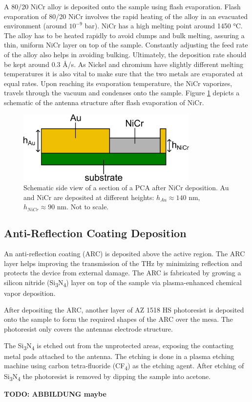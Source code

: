 A \num{80}/\num{20} NiCr alloy is deposited onto the sample using flash evaporation. Flash evaporation of \num{80}/\num{20} NiCr involves the rapid heating of the alloy in an evacuated environment (around $10^{-9}$ \si{\bar}). NiCr has a high melting point around \num{1450} \si{\celsius}. The alloy has to be heated rapidly to avoid clumps and bulk melting, assuring a thin, uniform NiCr layer on top of the sample. Constantly adjusting the feed rate of the alloy also helps in avoiding bulking. Ultimately, the deposition rate should be kept around \num{0.3} \si{\angstrom}/\si{\s}. As Nickel and chromium have slightly different melting temperatures it is also vital to make sure that the two metals are evaporated at equal rates. Upon reaching its evaporation temperature, the NiCr vaporizes, travels through the vacuum and condenses onto the sample. Figure \ref{PCA_NICR} depicts a schematic of the antenna structure after flash evaporation of NiCr. 

\begin{figure}[ht]
    \centering
    \includegraphics[width=0.8\textwidth]{figures/Fabrication/PCA_after_NiCr.pdf}
    \caption{Schematic side view of a section of a PCA after NiCr deposition. Au and NiCr are deposited at different heights: $h_{Au} \approx 140$ \si{\nano \meter}, $h_{NiCr} \approx 90$ \si{\nano \meter}. Not to scale.}
    \label{PCA_NICR}
\end{figure}

\subsection{Anti-Reflection Coating Deposition}
An anti-reflection coating (ARC) is deposited above the active region. The ARC layer helps improving the transmission of the THz by minimizing reflection \cite{chenAntireflectionImplementationsTerahertz2014} and protects the device from external damage. The ARC is fabricated by growing a silicon nitride (Si\textsubscript{3}N\textsubscript{4}) layer on top of the sample via plasma-enhanced chemical vapor deposition. 

After depositing the ARC, another layer of AZ 1518 HS photoresist is deposited onto the sample to form the required shapes of the ARC over the mesa. The photoresist only covers the antennas electrode structure. 

The Si\textsubscript{3}N\textsubscript{4} is etched out from the unprotected areas, exposing the contacting metal pads attached to the antenna. The etching is done in a plasma etching machine using carbon tetra-fluoride (CF\textsubscript{4}) as the etching agent. After etching of Si\textsubscript{3}N\textsubscript{4} the photoresist is removed by dipping the sample into acetone.


\textbf{TODO: ABBILDUNG maybe}